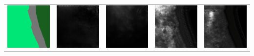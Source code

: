 \documentclass[twocolumn]{article}
\begin{document}
\begin{table}[t]
\begin{tabular}{c|c|c|c|c}
 				\includegraphics[width=0.25\columnwidth]{50.png} & \includegraphics[width=0.25\columnwidth]{51.png} & \includegraphics[width=0.25\columnwidth]{52.png} & \includegraphics[width=0.25\columnwidth]{53.png} & \includegraphics[width=0.25\columnwidth]{54.png} \\

\end{tabular}
\end{table}
\end{document}
